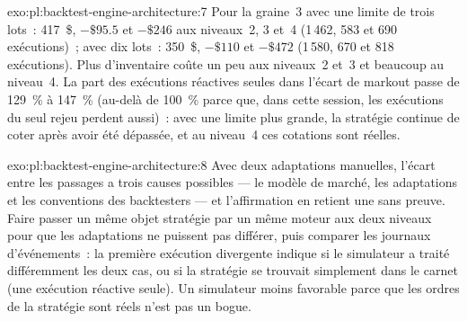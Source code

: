 \begin{solution}{exo:pl:backtest-engine-architecture:7}
Pour la graine~3 avec une limite de trois lots~: 417~\$, $-\$95.5$ et $-\$246$ aux niveaux~2, 3 et~4 (1\,462, 583 et 690 exécutions)~; avec dix lots~:
350~\$, $-\$110$ et $-\$472$ (1\,580, 670 et 818 exécutions). Plus d'inventaire coûte un peu aux niveaux~2 et~3 et beaucoup au niveau~4. La
part des exécutions réactives seules dans l'écart de markout passe de 129~\% à 147~\% (au-delà de 100~\% parce que, dans cette session, les exécutions du seul rejeu
perdent aussi)~: avec une limite plus grande, la stratégie continue de coter après avoir été dépassée, et au niveau~4 ces cotations sont réelles.
\end{solution}

\begin{solution}{exo:pl:backtest-engine-architecture:8}
Avec deux adaptations manuelles, l'écart entre les passages a trois causes possibles --- le modèle de marché, les adaptations et les
conventions des backtesters --- et l'affirmation en retient une sans preuve. Faire passer un même objet stratégie par un même moteur aux deux niveaux pour que les adaptations ne puissent pas
différer, puis comparer les journaux d'événements~: la première exécution divergente indique si le simulateur a traité différemment les deux cas, ou si la stratégie se trouvait simplement dans le carnet
(une exécution réactive seule). Un simulateur moins favorable parce que les ordres de la stratégie sont réels n'est pas un bogue.
\end{solution}

